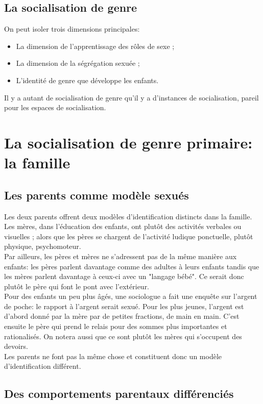 \documentclass[10pt, a4paper, openany]{book}
\begin{document}
\subsection{La socialisation de genre}

On peut isoler trois dimensions principales:
\begin{itemize}
\item La dimension de l'apprentissage des rôles de sexe ;
\item La dimension de la ségrégation sexuée ;
\item L'identité de genre que développe les enfants. 
\end{itemize}

Il y a autant de socialisation de genre qu'il y a d'instances de socialisation, pareil pour les espaces de socialisation.

\section{La socialisation de genre primaire: la famille}

\subsection{Les parents comme modèle sexués}

Les deux parents offrent deux modèles d'identification distincts dans la famille. Les mères, dans l'éducation des enfants, ont plutôt des activités verbales ou visuelles ; alors que les pères se chargent de l'activité ludique ponctuelle, plutôt physique, psychomoteur. \\
Par ailleurs, les pères et mères ne s'adressent pas de la même manière aux enfants: les pères parlent davantage comme des adultes à leurs enfants tandis que les mères parlent davantage à ceux-ci avec un "langage bébé". Ce serait donc plutôt le père qui font le pont avec l'extérieur. \\
Pour des enfants un peu plus âgés, une sociologue a fait une enquête sur l'argent de poche: le rapport à l'argent serait sexué. Pour les plus jeunes, l'argent est d'abord donné par la mère par de petites fractions, de main en main. C'est ensuite le père qui prend le relais pour des sommes plus importantes et rationalisés. On notera aussi que ce sont plutôt les mères qui s'occupent des devoirs. \\
Les parents ne font pas la même chose et constituent donc un modèle d'identification différent. 

\subsection{Des comportements parentaux différenciés}
\end{document}
